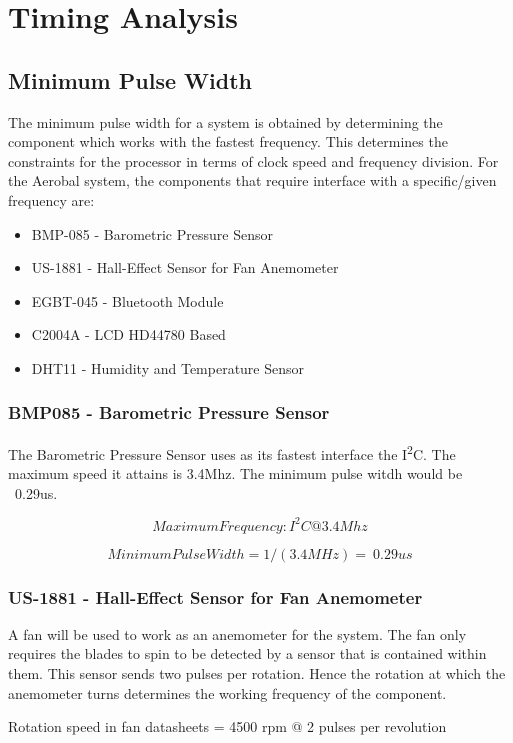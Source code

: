 \section{Timing Analysis}
	
	\subsection{Minimum Pulse Width}

		The minimum pulse width for a system is obtained by determining the component which works with the fastest frequency. This determines the constraints for the processor in terms of clock speed and frequency division. For the Aerobal system, the components that require interface with a specific/given frequency are:

		\begin{itemize}
			\item BMP-085 - Barometric Pressure Sensor
			\item US-1881 - Hall-Effect Sensor for Fan Anemometer
			\item EGBT-045 - Bluetooth Module
			\item C2004A - LCD HD44780 Based
			\item DHT11 - Humidity and Temperature Sensor
		\end{itemize}


		\subsubsection{BMP085 - Barometric Pressure Sensor}
			The Barometric Pressure Sensor uses as its fastest interface the I\textsuperscript{2}C. The maximum speed it attains is 3.4Mhz. The minimum pulse witdh would be ~0.29us.

			$$Maximum Frequency: I^2C @ 3.4Mhz$$

			$$Minimum Pulse Width = 1/(3.4MHz) = ~0.29us$$

	
		\subsubsection{US-1881 - Hall-Effect Sensor for Fan Anemometer}
			A fan will be used to work as an anemometer for the system. The fan only requires the blades to spin to be detected by a sensor that is contained within them. This sensor sends two pulses per rotation. Hence the rotation at which the anemometer turns determines the working frequency of the component.

			
				Rotation speed in fan datasheets = 4500 rpm @ 2 pulses per revolution
			
